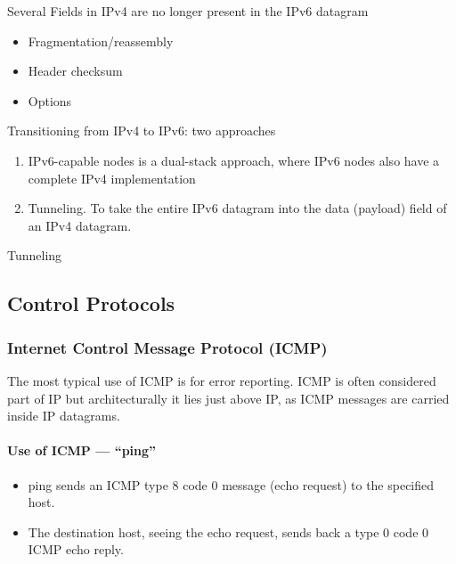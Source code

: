 Several Fields in IPv4 are no longer present in the IPv6 datagram
\begin{itemize}
    \item Fragmentation/reassembly
    \item Header checksum
    \item Options
\end{itemize}

Transitioning from IPv4 to IPv6: two approaches
\begin{enumerate}
    \item IPv6-capable nodes is a dual-stack approach, where IPv6
    nodes also have a complete IPv4 implementation
    \item Tunneling. To take the entire IPv6 datagram into the data
    (payload) field of an IPv4 datagram.
\end{enumerate}

Tunneling %


\subsection{Control Protocols}

\subsubsection{Internet Control Message Protocol (ICMP)}
The most typical use of ICMP is for error reporting. ICMP is often considered part of IP but architecturally it lies
just above IP, as ICMP messages are carried inside IP
datagrams.


\paragraph{Use of ICMP --- ``ping''}\quad

\begin{itemize}
    \item ping sends an ICMP
    type 8 code 0 message (echo request) to the
    specified host.
    \item The destination host, seeing the echo request, sends
    back a type 0 code 0 ICMP echo reply.
\end{itemize}

